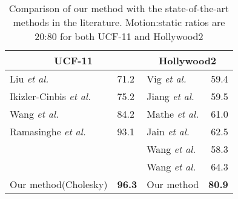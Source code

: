 \begin{table}[]
\centering
\caption{Comparison of our method with the state-of-the-art methods in the literature. Motion:static ratios are 20:80 for both
UCF-11 and Hollywood2}\label{tbl:comparison}
\begin{tabular}{@{}lllr@{}}
\toprule
\multicolumn{2}{c}{UCF-11}    & \multicolumn{2}{c}{Hollywood2} \\ \midrule
Liu \textit{et al.}\cite{liu2009recognizing}            & 71.2  & Vig \textit{et al.}\cite{vig2012space}           & 59.4      \\
Ikizler-Cinbis \textit{et al.}\cite{ikizler2010object} & 75.2 & Jiang \textit{et al.}\cite{jiang2012trajectory}      & 59.5      \\
Wang \textit{et al.}\cite{wang2011action}    & 84.2  & Mathe \textit{et al.}\cite{mathe2012dynamic}         & 61.0      \\
Ramasinghe \textit{et al.}\cite{7486474}         & 93.1        & Jain \textit{et al.}\cite{jain2013better}           & 62.5      \\
                      &         & Wang \textit{et al.}\cite{wang2011action}             & 58.3      \\
                      &         & Wang \textit{et al.}\cite{wang2013action}          & 64.3      \\ \midrule
Our method(Cholesky)  & \textbf{96.3}       & Our method        &        \textbf{80.9}       \\ \bottomrule

\end{tabular}

\end{table}



